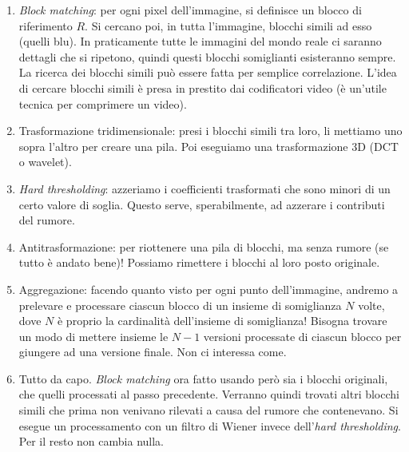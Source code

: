 \documentclass[a4paper,11pt]{article}
\begin{document}
\begin{enumerate}
    \item \textit{Block matching}: per ogni pixel dell'immagine, si definisce un blocco di riferimento $R$. Si cercano poi, in tutta l'immagine, blocchi simili ad esso (quelli blu).
    In praticamente tutte le immagini del mondo reale ci saranno dettagli che si ripetono, quindi questi blocchi somiglianti esisteranno sempre.
    La ricerca dei blocchi simili può essere fatta per semplice correlazione. L'idea di cercare blocchi simili è presa in prestito dai codificatori video
    (è un'utile tecnica per comprimere un video).
    \item Trasformazione tridimensionale: presi i blocchi simili tra loro, li mettiamo uno sopra l'altro per creare una pila. Poi eseguiamo una
    trasformazione 3D (DCT o wavelet).
    \item \textit{Hard thresholding}: azzeriamo i coefficienti trasformati che sono minori di un certo valore di soglia. Questo serve, sperabilmente, ad
    azzerare i contributi del rumore.
    \item Antitrasformazione: per riottenere una pila di blocchi, ma senza rumore (se tutto è andato bene)! Possiamo rimettere i blocchi al loro
    posto originale.
    \item Aggregazione: facendo quanto visto per ogni punto dell'immagine, andremo a prelevare e processare ciascun blocco di un insieme di somiglianza
    $N$ volte, dove $N$ è proprio la cardinalità dell'insieme di somiglianza! Bisogna trovare un modo di mettere insieme le $N-1$ versioni processate di
    ciascun blocco per giungere ad una versione finale. Non ci interessa come.
    \item Tutto da capo. \textit{Block matching} ora fatto usando però sia i blocchi originali, che quelli processati al passo precedente.
    Verranno quindi trovati altri blocchi simili che prima non venivano rilevati a causa del rumore che contenevano. Si esegue
    un processamento con un filtro di Wiener invece dell'\textit{hard thresholding}. Per il resto non cambia nulla.
\end{enumerate}
\end{document}
